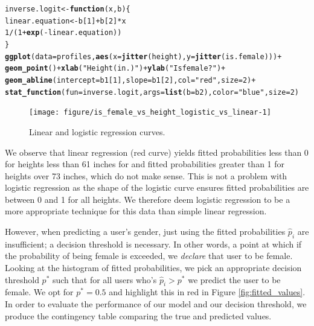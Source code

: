 \documentclass{article}\usepackage[]{graphicx}\usepackage[]{color}
\makeatletter
\newcommand{\hlnum}[1]{\textcolor[rgb]{0.686,0.059,0.569}{#1}}%
\newcommand{\hlstr}[1]{\textcolor[rgb]{0.192,0.494,0.8}{#1}}%
\newcommand{\hlopt}[1]{\textcolor[rgb]{0,0,0}{#1}}%
\newcommand{\hlstd}[1]{\textcolor[rgb]{0.345,0.345,0.345}{#1}}%
\newcommand{\hlkwa}[1]{\textcolor[rgb]{0.161,0.373,0.58}{\textbf{#1}}}%
\newcommand{\hlkwb}[1]{\textcolor[rgb]{0.69,0.353,0.396}{#1}}%
\newcommand{\hlkwc}[1]{\textcolor[rgb]{0.333,0.667,0.333}{#1}}%
\newcommand{\hlkwd}[1]{\textcolor[rgb]{0.737,0.353,0.396}{\textbf{#1}}}%
\newenvironment{kframe}{%
 \def\at@end@of@kframe{}%
 \ifinner\ifhmode%
  \def\at@end@of@kframe{\end{minipage}}%
  \begin{minipage}{\columnwidth}%
 \fi\fi%
 \def\FrameCommand##1{\hskip\@totalleftmargin \hskip-\fboxsep
 \colorbox{shadecolor}{##1}\hskip-\fboxsep
     \hskip-\linewidth \hskip-\@totalleftmargin \hskip\columnwidth}%
 \MakeFramed {\advance\hsize-\width
   \@totalleftmargin\z@ \linewidth\hsize
   \@setminipage}}%
 {\par\unskip\endMakeFramed%
 \at@end@of@kframe}
\newenvironment{knitrout}{}{} %
\makeatother
\begin{document}
\begin{knitrout}
\color{fgcolor}\begin{kframe}
\begin{alltt}
\hlstd{inverse.logit} \hlkwb{<-} \hlkwa{function}\hlstd{(}\hlkwc{x}\hlstd{,} \hlkwc{b}\hlstd{)\{}
  \hlstd{linear.equation} \hlkwb{<-} \hlstd{b[}\hlnum{1}\hlstd{]} \hlopt{+} \hlstd{b[}\hlnum{2}\hlstd{]}\hlopt{*}\hlstd{x}
  \hlnum{1}\hlopt{/}\hlstd{(}\hlnum{1}\hlopt{+}\hlkwd{exp}\hlstd{(}\hlopt{-}\hlstd{linear.equation))}
\hlstd{\}}
\hlkwd{ggplot}\hlstd{(}\hlkwc{data}\hlstd{=profiles,} \hlkwd{aes}\hlstd{(}\hlkwc{x}\hlstd{=}\hlkwd{jitter}\hlstd{(height),} \hlkwc{y}\hlstd{=}\hlkwd{jitter}\hlstd{(is.female)))} \hlopt{+}
  \hlkwd{geom_point}\hlstd{()} \hlopt{+} \hlkwd{xlab}\hlstd{(}\hlstr{"Height (in.)"}\hlstd{)} \hlopt{+} \hlkwd{ylab}\hlstd{(}\hlstr{"Is female?"}\hlstd{)} \hlopt{+}
  \hlkwd{geom_abline}\hlstd{(}\hlkwc{intercept}\hlstd{=b1[}\hlnum{1}\hlstd{],} \hlkwc{slope}\hlstd{=b1[}\hlnum{2}\hlstd{],} \hlkwc{col}\hlstd{=}\hlstr{"red"}\hlstd{,} \hlkwc{size}\hlstd{=}\hlnum{2}\hlstd{)} \hlopt{+}
  \hlkwd{stat_function}\hlstd{(}\hlkwc{fun} \hlstd{= inverse.logit,} \hlkwc{args}\hlstd{=}\hlkwd{list}\hlstd{(}\hlkwc{b}\hlstd{=b2),} \hlkwc{color}\hlstd{=}\hlstr{"blue"}\hlstd{,} \hlkwc{size}\hlstd{=}\hlnum{2}\hlstd{)}
\end{alltt}
\end{kframe}\begin{figure}

{\centering \texttt{[image: figure/is\_female\_vs\_height\_logistic\_vs\_linear-1]} 

}

\caption[Linear and logistic regression curves]{Linear and logistic regression curves.}\label{fig:is_female_vs_height_logistic_vs_linear}
\end{figure}


\end{knitrout}

We observe that linear regression (red curve) yields fitted probabilities less than 0 for heights less than 61 inches for and fitted probabilities greater than 1 for heights over 73 inches, which do not make sense.  This is not a problem with logistic regression as the shape of the logistic curve ensures fitted probabilities are between 0 and 1 for all heights.   We therefore deem logistic regression to be a more appropriate technique for this data than simple linear regression.

However, when predicting a user's gender, just using the fitted probabilities $\widehat{p}_i$ are insufficient; a decision threshold is necessary.  In other words, a point at which if the probability of being female is exceeded, we \textit{declare} that user to be female.  Looking at the histogram of fitted probabilities, we pick an appropriate decision threshold $p^*$ such that for all users who's $\widehat{p}_i > p^*$ we predict the user to be female.  We opt for $p^* = 0.5$ and highlight this in red in Figure \ref{fig:fitted_values}.  In order to evaluate the performance of our model and our decision threshold, we produce the contingency table comparing the true and predicted values.
\end{document}
